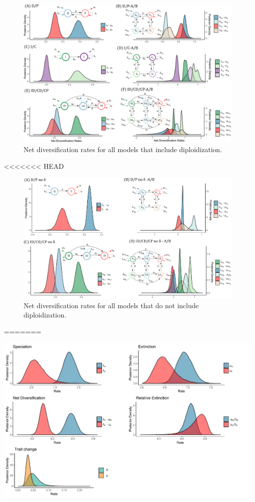 \begin{figure}
\includegraphics[width=\textwidth]{Netdiversificationallmodels.pdf}
  \caption{Net diversification rates for all models that include diploidization.}  
\label{figure:netdivall}
\end{figure}

<<<<<<< HEAD
\begin{figure}
\includegraphics[width=\textwidth]{netdiversificationallnodip.pdf}
  \caption{Net diversification rates for all models that do not include diploidization.}  
\label{figure:netdivnodip}
\end{figure}
=======
\begin{suppfigure}
\includegraphics[width=\textwidth]{bisseDPposteriordist.pdf}
\caption{Posterior distribution for each of the parameters in the D/P polyploidy model} %
\label{suppfigure:DP}
\end{suppfigure}

